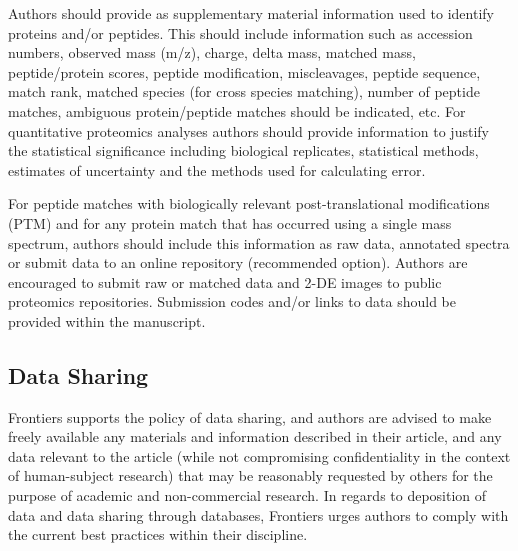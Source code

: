 \documentclass{frontiersSCNS} %
\begin{document}
Authors should provide as supplementary material information used to identify proteins and/or peptides. This should include information such as accession numbers, observed mass (m/z), charge, delta mass, matched mass, peptide/protein scores, peptide modification, miscleavages, peptide sequence, match rank, matched species (for cross species matching), number of peptide matches, ambiguous protein/peptide matches should be indicated, etc.
For quantitative proteomics analyses authors should provide information to justify the statistical significance including biological replicates, statistical methods, estimates of uncertainty and the methods used for calculating error.

For peptide matches with biologically relevant post-translational modifications (PTM) and for any protein match that has occurred using a single mass spectrum, authors should include this information as raw data, annotated spectra or submit data to an online repository (recommended option).
Authors are encouraged to submit raw or matched data and 2-DE images to public proteomics repositories. Submission codes and/or links to data should be provided within the manuscript.

\subsection{Data Sharing}

Frontiers supports the policy of data sharing, and authors are advised to make freely available any materials and information described in their article, and any data relevant to the article (while not compromising confidentiality in the context of human-subject research) that may be reasonably requested by others for the purpose of academic and non-commercial research. In regards to deposition of data and data sharing through databases, Frontiers urges authors to comply with the current best practices within their discipline.
\end{document}
